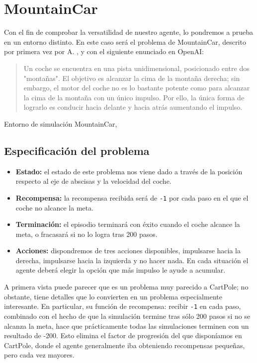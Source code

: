 \section{MountainCar}

Con el fin de comprobar la versatilidad de nuestro agente, lo pondremos a prueba en un entorno distinto. En este caso será el problema de MountainCar, descrito por primera vez por A. \citet{Moore90efficientmemory-based}, y con el siguiente enunciado en OpenAI:

\begin{quote}
    Un coche se encuentra en una pista unidimensional, posicionado entre dos "montañas". El objetivo es alcanzar la cima de la montaña derecha; sin embargo, el motor del coche no es lo bastante potente como para alcanzar la cima de la montaña con un único impulso. Por ello, la única forma de lograrlo es conducir hacia delante y hacia atrás aumentando el impulso.
\end{quote}

%
       {Entorno de simulación MountainCar, \citet{brockman2016openai}}


\subsection{Especificación del problema}

\begin{itemize}
    \item \textbf{Estado:} el estado de este problema nos viene dado a través de la posición respecto al eje de abscisas y la velocidad del coche.
    \item \textbf{Recompensa:} la recompensa recibida será de \texttt{-1} por cada paso en el que el coche no alcance la meta.
    \item \textbf{Terminación:} el episodio terminará con éxito cuando el coche alcance la meta, o fracasará si no lo logra tras 200 pasos.
    \item \textbf{Acciones:} dispondremos de tres acciones disponibles, impulsarse hacia la derecha, impulsarse hacia la izquierda y no hacer nada. En cada situación el agente deberá elegir la opción que más impulso le ayude a acumular.
\end{itemize}

A primera vista puede parecer que es un problema muy parecido a CartPole; no obstante, tiene detalles que lo convierten en un problema especialmente interesante. En particular, su función de recompensa: recibir \texttt{-1} en cada paso, combinado con el hecho de que la simulación termine tras sólo 200 pasos si no se alcanza la meta, hace que prácticamente todas las simulaciones terminen con un resultado de -200. Esto elimina el factor de progresión del que disponíamos en CartPole, donde el agente generalmente iba obteniendo recompensas pequeñas, pero cada vez mayores.


